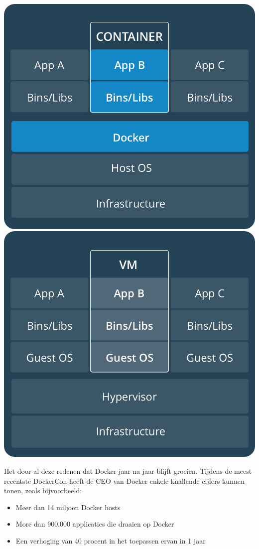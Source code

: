 \begin{center}
	\includegraphics[scale=0.2]{img/containers.png}
	\includegraphics[scale=0.2]{img/vms.png}
\end{center}


Het door al deze redenen dat Docker jaar na jaar blijft groeien. Tijdens de meest recentste DockerCon heeft de CEO van Docker enkele knallende cijfers kunnen tonen, zoals bijvoorbeeld:
\begin{itemize}[noitemsep]
	\item Meer dan 14 miljoen Docker hosts
	\item More dan 900.000 applicaties die draaien op Docker
	\item Een verhoging van 40 procent in het toepassen ervan in 1 jaar
\end{itemize}
~\autocite{DockerNumbers}

